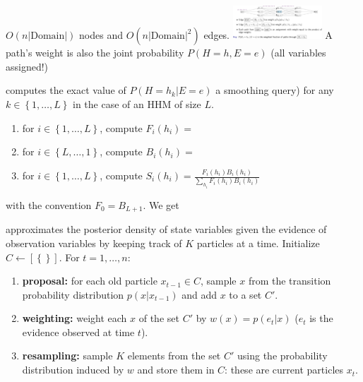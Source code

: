  $O(n|\text{Domain}|)$ nodes and
$O(n|\text{Domain}|^2)$ edges.
\includegraphics[width=0.25\textwidth]{topics/lattice_representation.jpg}
A path's weight is also the joint probability $P(H=h,E=e)$ (all variables assigned!)

 computes the exact value of $P(H=h_k|E=e)$ a
smoothing query) for any $k\in\left\{1,\dots,L\right\}$ in the case of an HHM of
size $L$. 
\begin{enumerate}
    \item for $i\in \left\{1,\dots,L\right\}$, compute $F_i(h_i)=$\\
    \item for $i\in \left\{L,\dots,1\right\}$, compute $B_i(h_i)=$\\
    \item for $i\in \left\{1,\dots,L\right\}$, compute $S_i(h_i)=\frac{F_i(h_i)B_i(h_i)}{\sum_{h_i}F_i(h_i)B_i(h_i)}$
\end{enumerate}
with the convention $F_0 = B_{L+1}$. We get 

 approximates the posterior
density of state variables given the evidence of observation variables by
keeping track of $K$ particles at a time. Initialize $C \leftarrow
\left[\left\{\right\}\right]$. For $t = 1,\dots,n$:
\begin{enumerate}
    \item \textbf{proposal:} for each old particle $x_{t-1} \in C$, sample $x$
        from the transition probability distribution $p(x|x_{t-1})$ and add $x$
        to a set $C'$.
    \item \textbf{weighting:} weight each $x$ of the set $C'$ by $w(x) =
        p(e_t|x)$ ($e_t$ is the evidence observed at time $t$).
    \item \textbf{resampling:} sample $K$ elements from the set $C'$ using the
        probability distribution induced by $w$ and store them in $C$: these are
        current particles $x_t$.
\end{enumerate}

